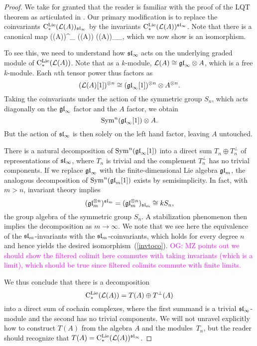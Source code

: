 \documentclass[11pt]{amsart}
\numberwithin{equation}{section}
\def\owen{\textcolor{magenta}{OG: }\textcolor{magenta}}
\begin{document}
\begin{proof}
We take for granted that the reader is familiar with the proof of the LQT theorem as articulated in \cite{LQ, Weibel, LodayCyclic}.
Our primary modification is to replace the coinvariants $\cliels(\cL(A))_{\sl_\infty}$ by the invariants $\cliels(\cL(A))^{\sl_\infty}$.
Note that there is a canonical map
\beqn\label{invtoco}
\cliels(\cL(A))^{\sl_\infty} \hookrightarrow \cliels(\cL(A)) \to \cliels(\cL(A))_{\sl_\infty},
\eeqn
which we now show is an isomorphism.

To see this, we need to understand how $\sl_\infty$ acts on the underlying graded module of $\cliels(\cL(A))$. Note that as a $k$-module, $\cL(A) \cong \gl_\infty \otimes A$, which is a free $k$-module. 
Each $n$th tensor power thus factors as
\[
(\cL(A)[1])^{\otimes n} \cong (\gl_\infty[1])^{\otimes n} \otimes A^{\otimes n}.
\]
Taking the coinvariants under the action of the symmetric group $S_n$, which acts diagonally on the $\gl_\infty$ factor and the $A$ factor, 
we obtain
\[
\Sym^n (\gl_\infty[1]) \otimes A.
\]
But the action of $\sl_\infty$ is then solely on the left hand factor, leaving $A$ untouched.

There is a natural decomposition of $\Sym^n (\gl_\infty[1])$ into a direct sum $T_n \oplus T_n^\perp$ of representations of $\sl_\infty$, where $T_n$ is trivial and the complement $T_n^\perp$ has no trivial components.
If we replace $\gl_\infty$ with the finite-dimensional Lie algebra $\gl_m$, 
the analogous decomposition of $\Sym^n (\gl_m[1])$ exists by semisimplicity. 
In fact, with $m > n$, invariant theory implies
\[
(\gl_m^{\otimes n})^{\sl_m} = (\gl_m^{\otimes n})_{\sl_m} \cong k S_n,
\]  
the group algebra of the symmetric group $S_n$.
A stabilization phenomenon then implies the decomposition as $m \to \infty$.
We note that we see here the equivalence of the $\sl_m$-invariants with the $\sl_m$-coinvariants,
which holds for every degree $n$ and hence yields the desired isomorphism~(\ref{invtoco}).
\owen{MZ points out we should show the filtered colimit here commutes with taking invariants (which is a limit), 
which should be true since filtered colimits commute with finite limits.}

We thus conclude that there is a decomposition
\[
\cliels(\cL(A)) = T(A) \oplus T^\perp(A)
\]
into a direct sum of cochain complexes,
where the first summand is a trivial $\sl_\infty$-module and the second has no trivial components.
We will not unravel explicitly how to construct $T(A)$ from the algebra $A$ and the modules~$T_n$,
but the reader should recognize that $T(A) = \cliels(\cL(A))^{\sl_\infty}$.


\end{proof}
\end{document}
